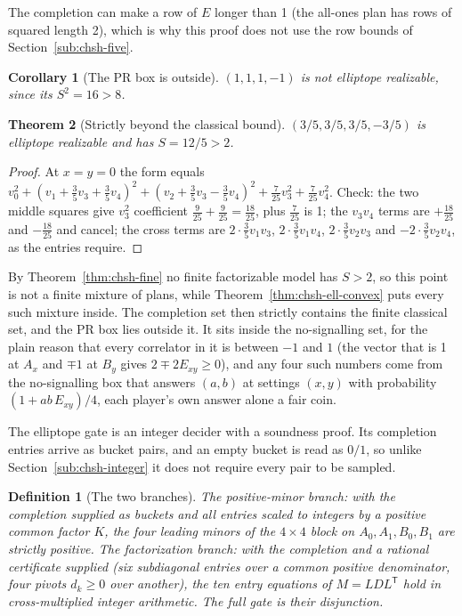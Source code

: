 \documentclass[11pt,twoside]{article}
\theoremstyle{thielethm}
\newtheorem{theorem}{Theorem}[section]
\newtheorem{corollary}[theorem]{Corollary}
\theoremstyle{thieledef}
\newtheorem{definition}{Definition}[section]
\theoremstyle{thieledef}
\theoremstyle{thieledef}
\theoremstyle{thielethm}
\theoremstyle{thieleobs}
\theoremstyle{thielethm}
\begin{document}
The completion can make a row of $E$ longer than 1 (the all-ones plan has rows of squared
length 2), which is why this proof does not use the row bounds of Section~\ref{sub:chsh-five}.

\begin{corollary}[The PR box is outside]\label{cor:chsh-ell-pr}
 $(1, 1, 1, -1)$ is not elliptope realizable, since its
$S^2 = 16 > 8$.\proofclosed
\end{corollary}

\begin{theorem}[Strictly beyond the classical bound]\label{thm:chsh-ell-beyond}
 $(3/5, 3/5, 3/5, -3/5)$ is elliptope realizable and has
$S = 12/5 > 2$.
\end{theorem}

\begin{proof}
At $x = y = 0$ the form equals
$v_0^2 + (v_1 + \tfrac35 v_3 + \tfrac35 v_4)^2 + (v_2 + \tfrac35 v_3 - \tfrac35 v_4)^2 +
\tfrac{7}{25} v_3^2 + \tfrac{7}{25} v_4^2$. Check: the two middle squares give
$v_3^2$ coefficient $\tfrac{9}{25} + \tfrac{9}{25} = \tfrac{18}{25}$, plus $\tfrac{7}{25}$ is
1; the $v_3 v_4$ terms are $+\tfrac{18}{25}$ and $-\tfrac{18}{25}$ and cancel; the cross
terms are $2 \cdot \tfrac35 v_1 v_3$, $2 \cdot \tfrac35 v_1 v_4$, $2 \cdot \tfrac35 v_2 v_3$
and $-2 \cdot \tfrac35 v_2 v_4$, as the entries require.
\end{proof}

By Theorem~\ref{thm:chsh-fine} no finite factorizable model has $S > 2$, so this point is not a finite
mixture of plans, while Theorem~\ref{thm:chsh-ell-convex} puts every such mixture inside. The completion
set then strictly contains the finite classical set, and the PR box lies outside it. It sits
inside the no-signalling set, for the plain reason that every correlator in it is between $-1$
and $1$ (the vector that is 1 at $A_x$ and $\mp 1$ at $B_y$ gives $2 \mp 2E_{xy} \ge 0$), and any
four such numbers come from the no-signalling box that answers $(a, b)$ at settings $(x, y)$ with
probability $(1 + ab\,E_{xy})/4$, each player's own answer alone a fair coin.

The elliptope gate is an integer decider with a soundness proof. Its
completion entries arrive as bucket pairs, and an empty bucket is read as $0/1$,
so unlike Section~\ref{sub:chsh-integer} it does not require every pair to be sampled.

\begin{definition}[The two branches]
The positive-minor branch: with the completion supplied as buckets and all
entries scaled to integers by a positive common factor $K$, the four leading minors of
the $4 \times 4$ block on $A_0, A_1, B_0, B_1$ are strictly positive. The factorization branch: with the completion and a rational certificate supplied (six subdiagonal entries over
a common positive denominator, four pivots $d_k \ge 0$ over another), the ten entry equations
of $M = L D L^{\mathsf T}$ hold in cross-multiplied integer arithmetic. The full gate is their disjunction.
\end{definition}
\end{document}
